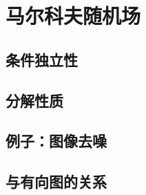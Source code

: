 \section{马尔科夫随机场}
\subsection*{条件独立性}
\subsection*{分解性质}
\subsection*{例子：图像去噪}
\subsection*{与有向图的关系}